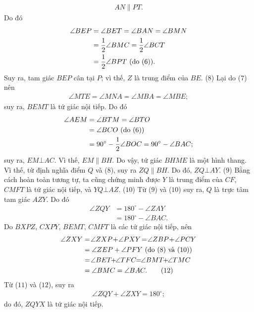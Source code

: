 \begin{multicols}{2}
\begin{align*}
		AN \parallel PT. \tag{$7$}
	\end{align*}
	Do đó
	\begin{align*}
		\angle BEP &= \angle BET = \angle BAN = \angle BMN \\
		&= \frac{1}{2}\angle BMC = \frac{1}{2}\angle BCT \\
		&= \frac{1}{2}\angle BPT\,\,({\text{\color{black}do }}(6)).
	\end{align*}
	Suy ra, tam giác $BEP$ cân tại $P$; vì thế, $Z$ là trung điểm của $BE$. \hfill ($8$)
	\vskip 0.05cm
	Lại do ($7$) nên
	\begin{align*}
		\angle MTE = \angle MNA = \angle MBA = \angle MBE;
	\end{align*}
	suy ra, $BEMT$ là tứ giác nội tiếp. Do đó
	\begin{align*}
			\angle AEM &= \angle BTM = \angle BTO \\
			&= \angle BCO \,\,({\text{\color{black}do }}(6))\\
			 &= 90^\circ - \frac{1}{2}\angle BOC = 90^\circ - \angle BAC;
	\end{align*}
	suy ra, $EM \bot AC$. Vì thế, $EM \parallel BH$. Do vậy, tứ giác $BHME$ là một hình thang. Vì thế, từ định nghĩa điểm $Q$ và ($8$), suy ra $ZQ \parallel BH$. Do đó, $ZQ \bot AY$. \hfill ($9$)
	\vskip 0.05cm
	Bằng cách hoàn toàn tương tự, ta cũng chứng minh được $Y$ là trung điểm của $CF$, $CMFT$ là tứ giác nội tiếp, và $YQ \bot AZ$. \hfill ($10$)
	\vskip 0.05cm
	Từ ($9$) và ($10$) suy ra, $Q$ là trực tâm tam giác $AZY$. Do đó
	\begin{align*}
		\angle ZQY &= 180^\circ - \angle ZAY \\
		&= 180^\circ - \angle BAC. \tag{$11$}
	\end{align*}
	Do $BXPZ$, $CXPY$, $BEMT$, $CMFT$ là các tứ giác nội tiếp, nên
	\begin{align*}
			\angle ZXY &= \!\angle ZXP \!+\! \angle PXY \!=\! \angle ZBP \!+\! \angle PCY\\
			&= \angle ZEP + \angle PFY \,\,({\text{\color{black}do }}(8) \,\,\text{\color{black}và }(10))\\
			&= \!\angle BET \!\!+\!\! \angle TFC \!\!=\!\! \angle BMT \!\!+\!\! \angle TMC\\
			&= \angle BMC = \angle BAC.\tag{$12$}
	\end{align*}
	Từ ($11$) và ($12$), suy ra
	\begin{align*}
		\angle ZQY + \angle ZXY = 180^\circ;
	\end{align*}
	do đó, $ZQYX$ là tứ giác nội tiếp.

\end{multicols}
